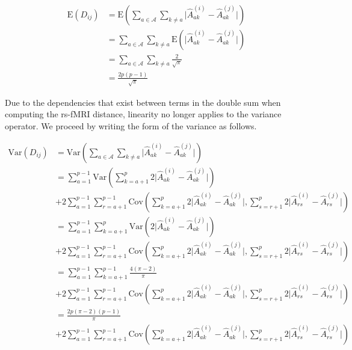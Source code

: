 \documentclass[10pt,letterpaper]{article}\usepackage[]{graphicx}\usepackage[]{color}
\begin{document}
\begin{equation}\label{eq:mu_DDistr_rs-fMRI}
\begin{aligned}
\text{E}(D_{ij}) &= \text{E}\left(\sum_{a \in \mathcal{A}} \sum_{k \neq a} \bigl|\hat{A}^{(i)}_{ak} - \hat{A}^{(j)}_{ak}\bigr|\right) \\
&= \sum_{a \in \mathcal{A}} \sum_{k \neq a} \text{E}\left(\bigl|\hat{A}^{(i)}_{ak} - \hat{A}^{(j)}_{ak}\bigr|\right) \\
&= \sum_{a \in \mathcal{A}} \sum_{k \neq a} \frac{2}{\sqrt{\pi}} \\
&= \frac{2p(p-1)}{\sqrt{\pi}}
\end{aligned}
\end{equation}

Due to the dependencies that exist between terms in the double sum when computing the rs-fMRI distance, linearity no longer applies to the variance operator. We proceed by writing the form of the variance as follows.

\begin{equation}\label{eq:var_DDistr_rs-fMRI}
\begin{aligned}
\text{Var}(D_{ij}) &= \text{Var}\left(\sum_{a \in \mathcal{A}} \sum_{k \neq a} \bigl|\hat{A}^{(i)}_{ak} - \hat{A}^{(j)}_{ak}\bigr|\right) \\
&= \sum_{a = 1}^{p-1} \text{Var}\left(\sum_{k=a+1}^{p} 2\bigl|\hat{A}^{(i)}_{ak} - \hat{A}^{(j)}_{ak}\bigr|\right) \\
&+ 2\sum_{a = 1}^{p-1} \sum_{r=a+1}^{p-1} \text{Cov}\left(\sum_{k=a+1}^{p} 2\bigl|\hat{A}^{(i)}_{ak} - \hat{A}^{(j)}_{ak}\bigr|, \sum_{s=r+1}^{p} 2\bigl|\hat{A}^{(i)}_{rs} - \hat{A}^{(j)}_{rs}\bigr|\right) \\
&= \sum_{a=1}^{p-1} \sum_{k=a+1}^{p} \text{Var}\left(2\bigl|\hat{A}^{(i)}_{ak} - \hat{A}^{(j)}_{ak}\bigr|\right) \\
&+ 2\sum_{a = 1}^{p-1} \sum_{r=a+1}^{p-1} \text{Cov}\left(\sum_{k=a+1}^{p} 2\bigl|\hat{A}^{(i)}_{ak} - \hat{A}^{(j)}_{ak}\bigr|, \sum_{s=r+1}^{p} 2\bigl|\hat{A}^{(i)}_{rs} - \hat{A}^{(j)}_{rs}\bigr|\right) \\
&= \sum_{a = 1}^{p-1} \sum_{k=a+1}^{p-1}\frac{4(\pi-2)}{\pi} \\
&+ 2\sum_{a = 1}^{p-1} \sum_{r=a+1}^{p-1} \text{Cov}\left(\sum_{k=a+1}^{p} 2\bigl|\hat{A}^{(i)}_{ak} - \hat{A}^{(j)}_{ak}\bigr|, \sum_{s=r+1}^{p} 2\bigl|\hat{A}^{(i)}_{rs} - \hat{A}^{(j)}_{rs}\bigr|\right) \\
&= \frac{2p(\pi-2)(p-1)}{\pi} \\
&+ 2\sum_{a = 1}^{p-1} \sum_{r=a+1}^{p-1} \text{Cov}\left(\sum_{k=a+1}^{p} 2\bigl|\hat{A}^{(i)}_{ak} - \hat{A}^{(j)}_{ak}\bigr|, \sum_{s=r+1}^{p} 2\bigl|\hat{A}^{(i)}_{rs} - \hat{A}^{(j)}_{rs}\bigr|\right)
\end{aligned}
\end{equation}
\end{document}
